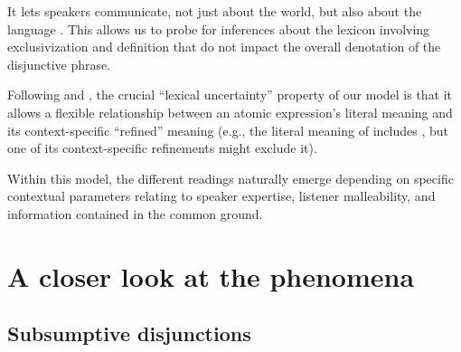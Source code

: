 \documentclass{article}
\begin{document}
\begin{examples}
  \begin{examples}
  \item It lets speakers communicate, not just about the world, but
    also about the language \citep{Smith:Goodman:Frank:2013}. This
    allows us to probe for inferences about the lexicon involving
    exclusivization and definition that do not impact the overall
    denotation of the disjunctive phrase.

  \item Following \citet{Bergen:Goodman:Levy:2012} and
    \citet{Smith:Goodman:Frank:2013}, the crucial ``lexical
    uncertainty'' property of our model is that it allows a flexible
    relationship between an atomic expression's literal meaning and
    its context-specific ``refined'' meaning (e.g., the literal
    meaning of  includes , but one of its
    context-specific refinements might exclude it).
  \end{examples}

\item Within this model, the different readings naturally emerge
  depending on specific contextual parameters relating to speaker
  expertise, listener malleability, and information contained in the
  common ground.

\end{examples}


\section{A closer look at the phenomena}\label{sec:data}


\subsection{Subsumptive disjunctions}\label{sec:data:subsumptive}
\end{document}
